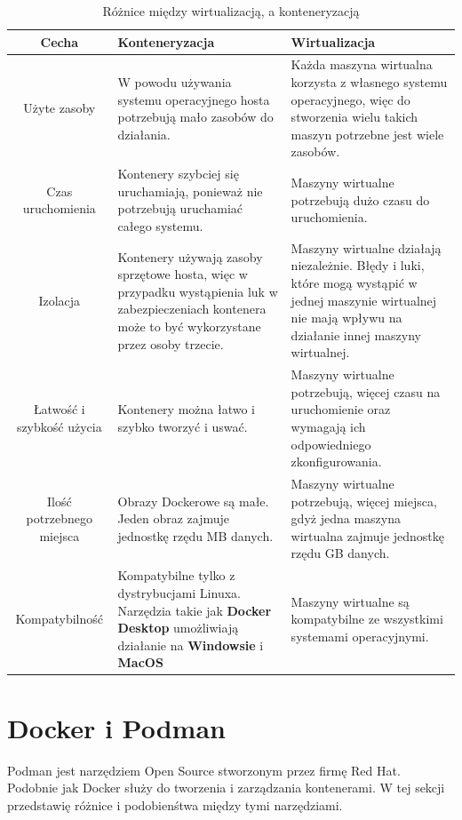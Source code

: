 \documentclass{iiuwb}
\begin{document}
\begin{table}[!h]
\caption{Różnice między wirtualizacją, a konteneryzacją}
\begin{center}
\begin{tabular}{| c |  p{5cm} | p{5cm} |}
\hline
Cecha  & Konteneryzacja & Wirtualizacja\\
\hline
\hline
Użyte zasoby & W powodu używania systemu operacyjnego hosta potrzebują mało zasobów do działania. & Każda maszyna wirtualna korzysta z własnego systemu operacyjnego, więc do stworzenia wielu takich maszyn potrzebne jest wiele zasobów. \\ \hline
Czas uruchomienia & Kontenery szybciej się uruchamiają, ponieważ nie potrzebują uruchamiać całego systemu. & Maszyny wirtualne potrzebują dużo czasu do uruchomienia.\\ \hline
Izolacja & Kontenery używają zasoby sprzętowe hosta, więc w przypadku wystąpienia luk w zabezpieczeniach kontenera może to być wykorzystane przez osoby trzecie. & Maszyny wirtualne działają niezależnie. Błędy i luki, które mogą wystąpić w jednej maszynie wirtualnej nie mają wpływu na działanie innej maszyny wirtualnej.\\ \hline
Łatwość i szybkość użycia & Kontenery można łatwo i szybko tworzyć i uswać.  & Maszyny wirtualne potrzebują, więcej czasu na uruchomienie oraz wymagają ich odpowiedniego zkonfigurowania.  \\ \hline
Ilość potrzebnego miejsca & Obrazy Dockerowe są małe. Jeden obraz zajmuje jednostkę rzędu MB danych.  & Maszyny wirtualne potrzebują, więcej miejsca, gdyż jedna maszyna wirtualna zajmuje jednostkę rzędu GB danych.  \\ \hline
Kompatybilność & Kompatybilne tylko z dystrybucjami Linuxa. Narzędzia takie jak \textbf{Docker Desktop} umożliwiają działanie na \textbf{Windowsie} i \textbf{MacOS} & Maszyny wirtualne są kompatybilne ze wszystkimi systemami operacyjnymi. \\ 
\hline
\end{tabular}
\label{tab:Różnice między konteneryzacją, a wirtualizacją}
\end{center}
\end{table}

\section{Docker i Podman}

Podman jest narzędziem Open Source stworzonym przez firmę Red Hat. Podobnie jak Docker służy do tworzenia i zarządzania kontenerami. W tej sekcji przedstawię różnice i podobienśtwa między tymi narzędziami.
\end{document}
